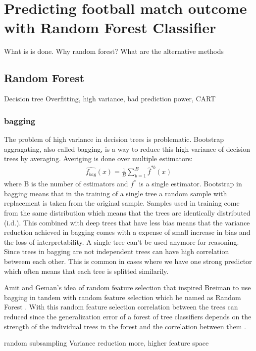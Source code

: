 \section{Predicting football match outcome with Random Forest Classifier}
What is is done. Why random forest? What are the alternative methods
\subsection{Random Forest}
Decision tree
Overfitting, high variance, bad prediction power, CART

\subsubsection{bagging}
The problem of high variance in decision trees is problematic. Bootstrap aggragating, also called bagging, is a way to reduce this high variance of decision trees by averaging. Averiging is done over multiple estimators:
\begin{align}
    \hat {f_{bag}}(x) = \frac{1}{B}\sum_{b = 1}^{B} \hat {f}^{*b}(x)
\end{align}
where B is the number of estimators and ${f}^{*}$ is a single estimator. Bootstrap in bagging means that in the training of a single tree a random sample with replacement is taken from the original sample. Samples used in training come from the same distribution which means that the trees are identically distributed (i.d.). This combined with deep trees that have less bias means that the variance reduction achieved in bagging comes with a expense of small increase in bias and the loss of interpretability. A single tree can't be used anymore for reasoning. Since trees in bagging are not independent trees can have high correlation betweem each other. This is common in cases where we have one strong predictor which often means that each tree is splitted similarily. \cite{friedman2001elements}

Amit and Geman's \cite{amit1997shape} idea of random feature selection that inspired Breiman to use bagging in tandem with random feature selection which he named as Random Forest \cite{breiman2001random}. With this random feature selection correlation between the trees can reduced since the generalization error of a forest of tree classifiers depends on the strength of the individual trees in the forest and the correlation between them \cite{breiman2001random}.

random subsampling
Variance reduction more, higher feature space

